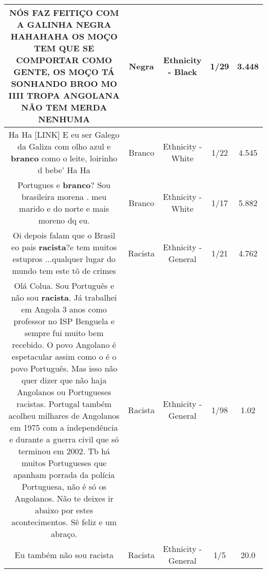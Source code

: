 \documentclass[11pt]{article}
\newlength\mylength
\begin{document}
\begin{center}
\begin{longtable}{|C{.65\mylength}|C{.30\mylength}|C{.12\mylength}|C{.12\mylength}|C{.12\mylength}|}
  \small NÓS FAZ FEITIÇO COM A GALINHA \textbf{NEGRA} HAHAHAHA OS MOÇO TEM QUE SE COMPORTAR COMO GENTE, OS MOÇO TÁ SONHANDO BROO MO IIII TROPA ANGOLANA NÃO TEM MERDA NENHUMA\normalsize   & Negra & Ethnicity - Black & 1/29 & 3.448 \\  \hline
  \small Ha Ha   [LINK]   E eu ser Galego da Galiza com olho azul e \textbf{branco} como o leite, loirinho d bebe'  Ha Ha\normalsize   & Branco & Ethnicity - White & 1/22 & 4.545 \\  \hline
  \small Portugues e \textbf{branco}? Sou brasileira morena . meu marido e do norte e mais moreno dq eu.\normalsize   & Branco & Ethnicity - White & 1/17 & 5.882 \\  \hline
  \small Oi depois falam que o Brasil eo pais \textbf{racista}?e tem muitos estupros ...qualquer lugar do mundo tem este tô de crimes\normalsize   & Racista & Ethnicity - General & 1/21 & 4.762 \\  \hline
  \small Olá Colua. Sou Português e não sou \textbf{racista}. Já trabalhei em Angola 3 anos como professor no ISP Benguela e sempre fui muito bem recebido. O povo Angolano é espetacular assim como o é o povo Português. Mas isso não quer dizer que não haja Angolanos ou Portugueses racistas. Portugal também acolheu milhares de Angolanos em 1975 com a independência e durante a guerra civil que só terminou em 2002. Tb há muitos Portugueses que apanham porrada da polícia Portuguesa, não é só os Angolanos. Não te deixes ir abaixo por estes acontecimentos. Sê feliz e um abraço.\normalsize   & Racista & Ethnicity - General & 1/98 & 1.02 \\  \hline
  \small Eu também  não  sou racista\normalsize   & Racista & Ethnicity - General & 1/5 & 20.0 \\  \hline

\end{longtable}
\end{center}
\end{document}
